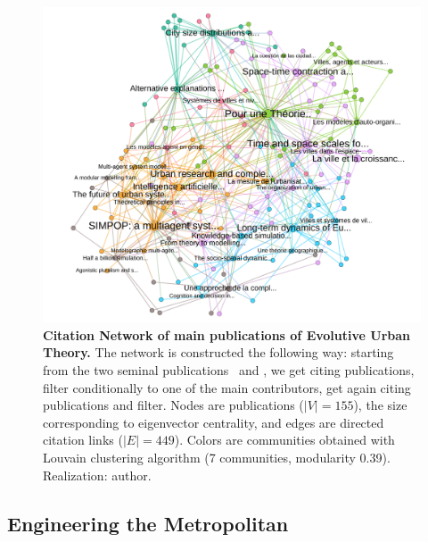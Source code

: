 \documentclass[runningheads,a4paper]{llncs2e/llncs}
\begin{document}
\begin{figure}[h!]
\hspace{-4cm}
\includegraphics[width=1.5\textwidth]{figures/core}
\caption{\textbf{Citation Network of main publications of Evolutive Urban Theory.} The network is constructed the following way: starting from the two seminal publications~\cite{pumain1997pour} and \cite{sanders1997simpop}, we get citing publications, filter conditionally to one of the main contributors, get again citing publications and filter. Nodes are publications ($\left|V\right|=155$), the size corresponding to eigenvector centrality, and edges are directed citation links ($\left|E\right|=449$). Colors are communities obtained with Louvain clustering algorithm (7 communities, modularity 0.39). Realization: author.}
\label{fig:citnw}
\end{figure}




\subsection{Engineering the Metropolitan}
\end{document}
